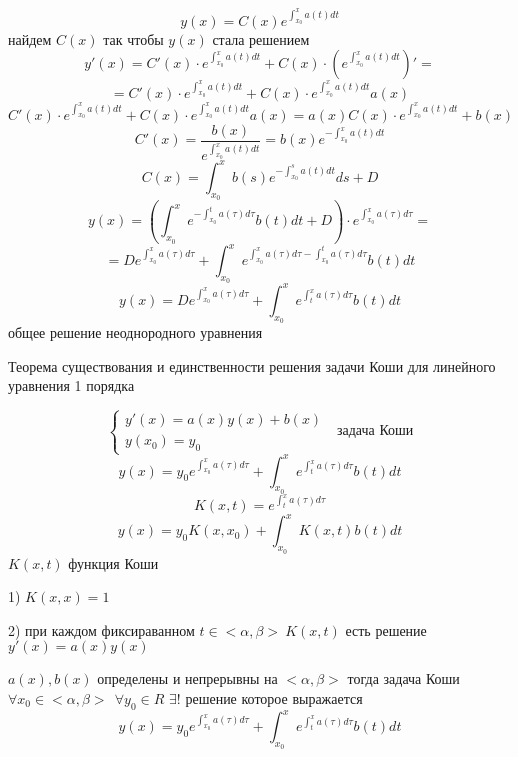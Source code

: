 \begin{block}
  $$
  y(x) = C(x) e^{\int_{x_0}^x a(t) dt}
  $$
  найдем $C(x)$ так чтобы $y(x)$ стала решением
  $$
  y'(x) = C'(x) \cdot e^{\int_{x_0}^x a(t) dt} +
  C(x) \cdot \left( e^{\int_{x_0}^x a(t) dt} \right)' =
  $$
  $$
  = C'(x) \cdot e^{\int_{x_0}^x a(t) dt} +
  C(x) \cdot e^{\int_{x_0}^x a(t) dt} a(x)
  $$
  $$
  C'(x) \cdot e^{\int_{x_0}^x a(t) dt} +
  C(x) \cdot e^{\int_{x_0}^x a(t) dt} a(x) =
  a(x) C(x) \cdot e^{\int_{x_0}^x a(t) dt} + b(x)
  $$
  $$
  C'(x) = \frac{b(x)}{e^{\int_{x_0}^x a(t) dt}} =
  b(x) e^{-\int_{x_0}^x a(t) dt}
  $$
  $$
  C(x) = \int_{x_0}^x b(s) e^{-\int_{x_0}^s a(t) dt} ds + D
  $$
  $$
  y(x) = \left( \int_{x_0}^{x} e^{-\int_{x_0}^t a(\tau) d\tau}
  b(t)dt + D \right) \cdot e^{\int_{x_0}^x a(\tau) d\tau} =
  $$
  $$
  = D e^{\int_{x_0}^x a(\tau) d\tau} + \int_{x_0}^x
  e^{\int_{x_0}^x a(\tau) d\tau - \int_{x_0}^t a(\tau) d\tau} b(t)dt
  $$
  $$
  y(x) = D e^{\int_{x_0}^x a(\tau) d\tau} + \int_{x_0}^x
  e^{\int_{t}^x a(\tau) d\tau} b(t)dt
  $$
  общее решение неоднородного уравнения
\end{block}

\begin{title}[\Large]
  Теорема существования и единственности решения задачи Коши для линейного
  уравнения 1 порядка
\end{title}

\begin{block}
  $$
  \left\{
  \begin{array}{l}
    y'(x) = a(x)y(x) + b(x) \\
    y(x_0) = y_0
  \end{array}
  \right. ~~~ \text{задача Коши}
  $$
  $$
  y(x) = y_0 e^{\int_{x_0}^x a(\tau) d\tau} + \int_{x_0}^x
  e^{\int_{t}^x a(\tau) d\tau} b(t)dt
  $$
  $$
  K(x, t) = e^{\int_t^x a(\tau) d\tau}
  $$
  $$
  y(x) = y_0 K(x, x_0) + \int_{x_0}^x K(x, t) b(t) dt
  $$
  $K(x, t)$ функция Коши
\end{block}

\begin{block}[Свойства]
  1) $K(x, x) = 1$

  2) при каждом фиксираванном $t \in <\alpha, \beta> ~ K(x, t)$ есть решение
  $y'(x) = a(x)y(x)$
\end{block}

\begin{theorem}
  $a(x), b(x)$ определены и непрерывны на $<\alpha, \beta>$
  тогда задача Коши $\forall x_0 \in <\alpha, \beta> ~~ \forall y_0 \in R$
  $\exists !$ решение которое выражается
  $$
  y(x) = y_0 e^{\int_{x_0}^x a(\tau) d\tau} + \int_{x_0}^x
  e^{\int_{t}^x a(\tau) d\tau} b(t)dt
  $$
\end{theorem}

